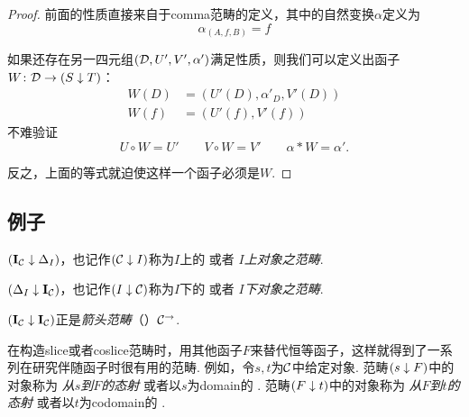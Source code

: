   \begin{proof}
    前面的性质直接来自于comma范畴的定义，其中的自然变换$\alpha$定义为
    \begin{equation*}
      \alpha_{(A,f,B)}=f
    \end{equation*}

    如果还存在另一四元组$({\cal D},U',V',\alpha')$满足性质，则我们可以定义出函子$W\colon{\cal D}\to (S\downarrow T)$：
    \begin{align*}
      W(D) &= (U'(D),\alpha'_D ,V'(D)) \\
      W(f) &= (U'(f), V'(f))
    \end{align*}
    不难验证
    \begin{equation*}
      U\circ W = U'\qquad V\circ W = V'\qquad \alpha\ast W = \alpha'.
    \end{equation*}

    反之，上面的等式就迫使这样一个函子必须是$W$.
  \end{proof}

\subsection{例子}
  \begin{exam}%
    $(\operatorname{\mathbf{I}}_{{\cal C}} \downarrow \Delta_I)$，也记作$({\cal C} \downarrow I)$称为$I$上的 或者 \emph{$I$上对象之范畴}.
  \end{exam}

  \begin{exam}%
    $(\Delta_I \downarrow \operatorname{\mathbf{I}}_{{\cal C}})$，也记作$(I \downarrow {\cal C})$称为$I$下的 或者 \emph{$I$下对象之范畴}.
  \end{exam}

  \begin{exam}%
    $(\operatorname{\mathbf{I}}_{{\cal C}}\downarrow\operatorname{\mathbf{I}}_{{\cal C}})$正是\emph{箭头范畴}（）${\cal C}^{\to}$.
  \end{exam}

  \begin{exam}
    在构造slice或者coslice范畴时，用其他函子$F$来替代恒等函子，这样就得到了一系列在研究伴随函子时很有用的范畴.
    例如，令$s,t$为${\cal C}$中给定对象.
    范畴$(s\downarrow F)$中的对象称为 \emph{从$s$到$F$的态射} 或者以$s$为domain的 .
    范畴$(F\downarrow t)$中的对象称为 \emph{从$F$到$t$的态射} 或者以$t$为codomain的 .
  \end{exam}

